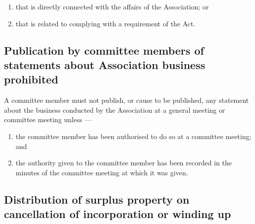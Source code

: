 \documentclass[../constitution.tex]{subfiles}
\begin{document}
\begin{enumerate}
  \begin{enumerate}
  
  \item that is directly connected with the affairs of the Association; or
  \item that is related to complying with a requirement of the Act.
  \end{enumerate}


\end{enumerate}

\hypertarget{publication-by-committee-members-of-statements-about-association-business-prohibited}{%
\subsection{Publication by committee members of statements about Association business prohibited}\label{publication-by-committee-members-of-statements-about-association-business-prohibited}}

A committee member must not publish, or cause to be published, any statement about the business conducted by the Association at a general meeting or committee meeting unless ---

  \begin{enumerate}
  
  \item the committee member has been authorised to do so at a committee meeting; and
  \item the authority given to the committee member has been recorded in the minutes of the committee meeting at which it was given.
  \end{enumerate}


\hypertarget{distribution-of-surplus-property-on-cancellation-of-incorporation-or-winding-up}{%
\subsection{Distribution of surplus property on cancellation of incorporation or winding up}\label{distribution-of-surplus-property-on-cancellation-of-incorporation-or-winding-up}}
\end{document}
